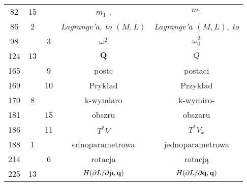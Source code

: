 \documentclass[a4paper,11pt]{article}
\begin{document}
\begin{center}
\begin{tabular}{|c|c|c|c|c|}
    82  & 15 & & $m_{ 1 }${  }, & $m_{ 1 }$ \\
    86  &  2 & & \textit{Lagrange’a, to $( M, L )$}
           & \textit{Lagrange’a $( M, L )$, to} \\
    98  & &  3 & $\omega^{ 2 }$ & $\omega_{ 0 }^{ 2 }$ \\
    124 & 13 & & $\mathbf{Q}$ & $Q$ \\
    165 & &  9 & postc & postaci \\
    169 & & 10 & Prykład & Przykład \\
    170 & 8 & & k-wymiaro & k-wymiro- \\
    181 & & 15 & obszru & obszaru \\
    186 & & 11 & $T^{ * } V$ & $T^{ * } V_{ x }$ \\
    188 & 1 & & ednoparametrowa & jednoparametrowa \\
    214 & & 6 & rotacja & rotacją \\
    225 & 13 & & $H( \partial L / \partial \dot{ \mathbf{p} }, \mathbf{q} )$
           & $H( \partial L / \partial \dot{ \mathbf{q} }, \mathbf{q} )$ \\
    \hline
  \end{tabular}





  \newpage


\end{center}
\end{document}
